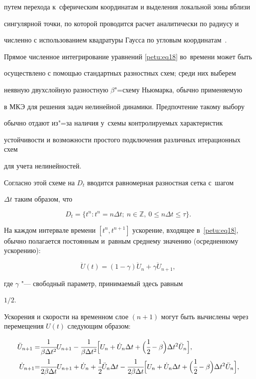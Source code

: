 путем перехода к~сферическим координатам и выделения локальной зоны вблизи

сингулярной точки, по которой проводится расчет аналитически по радиусу и

численно с использованием квадратуры Гаусса по угловым координатам~\cite{petu:bib14}.



Прямое численное интегрирование уравнений \eqref{petu:eq18} во~времени может быть

осуществлено с помощью стандартных разностных схем; среди них выберем

неявную двухслойную разностную $\beta$"=схему Ньюмарка, обычно применяемую

в МКЭ для решения задач нелинейной динамики. Предпочтение такому выбору

обычно отдают из"=за наличия у~схемы контролируемых характеристик

устойчивости и возможности простого подключения различных итерационных схем

для учета нелинейностей.



Согласно этой схеме на $D_t$ вводится равномерная разностная сетка с~шагом

$\Delta t$ таким образом, что 

$$D_t =\bigl\{ t^n : t^n=n\Delta t;~ n\in \mathbb Z,~ 0\le n\Delta t\le \tau \bigr\}.$$ 

На каждом интервале времени $[ t^n, t^{n+1} ]$ ускорение, входящее в~\eqref{petu:eq18}, обычно полагается постоянным и~равным среднему значению  (осредненному ускорению):

\[

\ddot {U}(t)=(1-\gamma )\ddot {U}_n +\gamma \ddot {U}_{n+1},

\]

где $\gamma $ "--- свободный параметр, принимаемый здесь равным

$1/2$.



Ускорения и скорости на временном слое $(n+1)$ могут быть вычислены через перемещения $U(t)$ следующим образом:

\begin{equation}

\label{petu:eq19}

\begin{aligned}

\ddot {U}_{n+1} = & \cfrac{1}{\beta \Delta t^2} U_{n+1} -\cfrac{1}{\beta \Delta t^2}

\Bigl[U_n +\dot {U}_n \Delta t+\Bigl(\cfrac 12-\beta \Bigr)\Delta t^2\ddot {U}_n \Bigr],\\

\dot {U}_{n+1} {=}& \cfrac{1}{2\beta \Delta t} U_{n+1}  + \dot {U}_n  + \cfrac 12\ddot {U}_n \Delta

t - \cfrac 1{2\beta

\Delta t} \Bigl[U_n  + \dot {U}_n \Delta t + \Bigl(\cfrac 1 2 - \beta \Bigr)\Delta t^2\ddot {U}_n \Bigr],

\end{aligned}

\end{equation}


